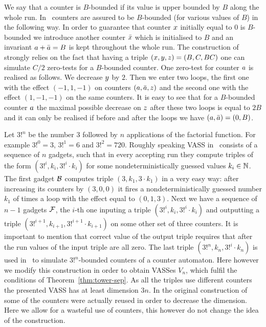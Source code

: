 We say that a counter is $B$-bounded if its value is upper bounded by $B$ along the whole run.
In~\cite{DBLP:conf/stoc/CzerwinskiLLLM19} counters are assured to be $B$-bounded (for various values of $B$)
in the following way. In order to guarantee that counter $x$ initially equal to $0$ is $B$-bounded
we introduce another counter $\bar{x}$ which is initialised to $B$ and an invariant
$a + \bar{a} = B$ is kept throughout the whole run.
The construction of~\cite{DBLP:conf/stoc/CzerwinskiLLLM19} strongly relies on the fact that having
a triple $(x, y, z) = (B, C, BC)$ one can simulate $C / 2$ zero-tests for a $B$-bounded counter.
One zero-test for counter $a$ is realised as follows. We decrease $y$ by $2$. Then we enter two loops, the first
one with the effect $(-1, 1, -1)$ on counters $(a, \bar{a}, z)$
and the second one with the effect $(1, -1, -1)$ on the same counters. It is easy to see that for a $B$-bounded
counter $a$ the maximal possible decrease on $z$ after these two loops is equal to $2B$ and it can
only be realised if before and after the loops we have $(a, \bar{a}) = (0, B)$.

Let $3!^n$ be the number $3$ followed by $n$ applications of the factorial function.
For example $3!^0 = 3$, $3!^1 = 6$ and $3!^2 = 720$.
Roughly speaking VASS in~\cite{DBLP:conf/stoc/CzerwinskiLLLM19} consists of a sequence of $n$ gadgets,
such that in every accepting run they compute triples of the form $(3!^i, k_i, 3!^i \cdot k_i)$
for some nondeterministically guessed values $k_i \in \mathbb{N}$.
The first gadget $\mathcal{B}$ computes triple $(3, k_1, 3 \cdot k_1)$ in a very easy way: after increasing its counters by $(3, 0, 0)$
it fires a nondeterministically guessed number $k_1$ of times a loop with the effect equal to $(0, 1, 3)$.
Next we have a sequence of $n-1$ gadgets $\mathcal{F}$, the $i$-th one inputing a triple $(3!^i, k_i, 3!^i \cdot k_i)$
and outputting a triple $(3!^{i+1}, k_{i+1}, 3!^{i+1} \cdot k_{i+1})$ on some other set of three counters.
It is important to mention that correct value of the output triple requires that after the run values of the input triple are all zero.
The last triple $(3!^n, k_n, 3!^i \cdot k_n)$ is used in~\cite{DBLP:conf/stoc/CzerwinskiLLLM19}
to simulate $3!^n$-bounded counters of a counter automaton.
Here however we modify this construction in order to obtain VASSes $V_n$,
which fulfil the conditions of Theorem~\ref{thm:tower-sep}.
As all the triples use different counters the presented VASS has at least dimension $3n$.
In the original construction of~\cite{DBLP:conf/stoc/CzerwinskiLLLM19}
some of the counters were actually reused in order to decrease the dimension.
Here we allow for a wasteful use of counters, this however do not change the idea of the construction.

